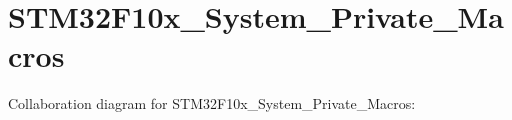 \section{S\+T\+M32\+F10x\+\_\+\+System\+\_\+\+Private\+\_\+\+Macros}
\label{group___s_t_m32_f10x___system___private___macros}
Collaboration diagram for S\+T\+M32\+F10x\+\_\+\+System\+\_\+\+Private\+\_\+\+Macros\+:
